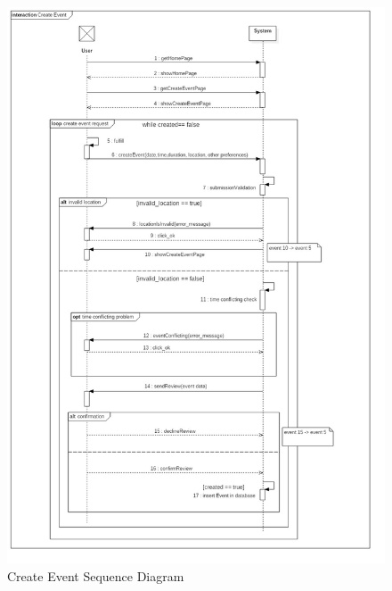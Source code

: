 \documentclass{article}
\begin{document}
\begin{figure}[H]
\includegraphics[width=\linewidth]{Create_Event.jpg}
\caption{Create Event Sequence Diagram}
\label{fig:SQ3}
\end{figure}
\end{document}
